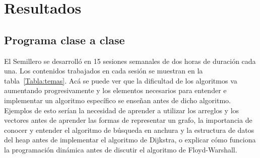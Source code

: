\documentclass[conference]{IEEEtran}
\begin{document}
\section{Resultados}

\subsection{Programa clase a clase}
El Semillero se desarrolló en 15 sesiones semanales de dos horas de duración cada una. Los contenidos trabajados en cada sesión se muestran en la tabla~\ref{Tabla:temas}. Acá se puede ver que la dificultad de los algoritmos va aumentando progresivamente y los elementos necesarios para entender e implementar un algoritmo específico se enseñan antes de dicho algoritmo. Ejemplos de esto serían la necesidad de aprender a utilizar los arreglos y los vectores antes de aprender las formas de representar un grafo, la importancia de conocer y entender el algoritmo de búsqueda en anchura y la estructura de datos del heap antes de implementar el algoritmo de Dijkstra, o explicar cómo funciona la programación dinámica antes de discutir el algoritmo de Floyd-Warshall.
\end{document}
